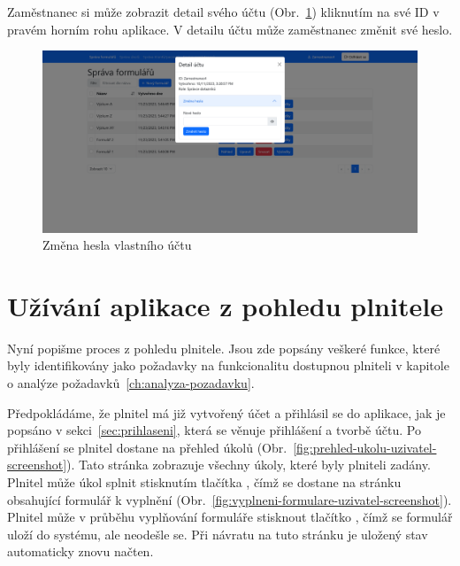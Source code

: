 Zaměstnanec si může zobrazit detail svého účtu (Obr.~\ref{fig:zmena-hesla-zamestnanec}) kliknutím na své ID v pravém horním rohu aplikace.
V detailu účtu může zaměstnanec změnit své heslo.

\begin{figure}[H]
    \includegraphics[width=\textwidth]{../img/screenshots/zmena-hesla-zamestnanec}
    \caption{Změna hesla vlastního účtu}\label{fig:zmena-hesla-zamestnanec}
\end{figure}

\section{Užívání aplikace z pohledu plnitele}\label{sec:uzivani-aplikace-z-pohledu-plnitele}

Nyní popišme proces z pohledu plnitele.
Jsou zde popsány veškeré funkce, které byly identifikovány jako požadavky na funkcionalitu dostupnou plniteli v kapitole o analýze požadavků~\ref{ch:analyza-pozadavku}.

Předpokládáme, že plnitel má již vytvořený účet a přihlásil se do aplikace, jak je popsáno v sekci~\ref{sec:prihlaseni}, která se věnuje přihlášení a tvorbě účtu.
Po přihlášení se plnitel dostane na přehled úkolů (Obr.~\ref{fig:prehled-ukolu-uzivatel-screenshot}).
Tato stránka zobrazuje všechny úkoly, které byly plniteli zadány.
Plnitel může úkol splnit stisknutím tlačítka , čímž se dostane na stránku obsahující formulář k vyplnění (Obr.~\ref{fig:vyplneni-formulare-uzivatel-screenshot}).
Plnitel může v průběhu vyplňování formuláře stisknout tlačítko , čímž se formulář uloží do systému, ale neodešle se.
Při návratu na tuto stránku je uložený stav automaticky znovu načten.

